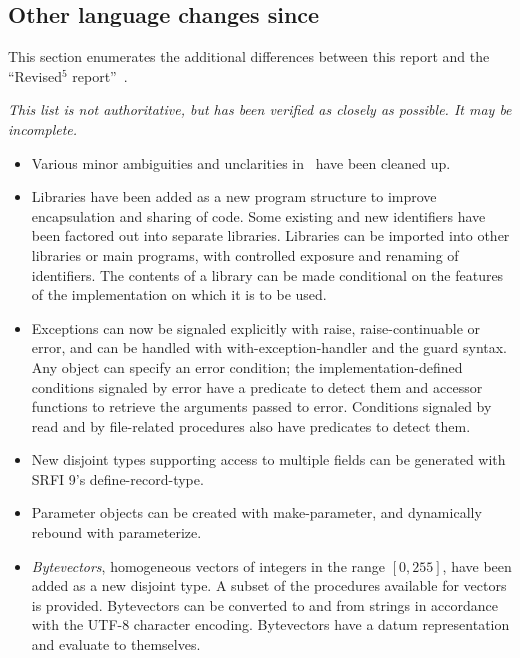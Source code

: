 \subsection*{Other language changes since \rfivers}
\label{differences}
This section enumerates the additional differences between this report and
the ``Revised$^5$ report''~\cite{R5RS}.

{\em This list is not authoritative, but has been verified as closely
as possible.  It may be incomplete.}


\begin{itemize}

\item Various minor ambiguities and unclarities in \rfivers\ have been cleaned up.

\item Libraries have been added as a new program structure to improve
encapsulation and sharing of code.  Some existing and new identifiers
have been factored out into separate libraries.
Libraries can be imported into other libraries or main programs, with
controlled exposure and renaming of identifiers.
The contents of a library can be made conditional on the features of
the implementation on which it is to be used.

\item Exceptions can now be signaled explicitly with {\cf raise},
{\cf raise-continuable} or {\cf error}, and can be handled with {\cf
with-exception-handler} and the {\cf guard} syntax.
Any object can specify an error condition; the implementation-defined
conditions signaled by {\cf error} have a predicate to detect them and accessor functions to
retrieve the arguments passed to {\cf error}.
Conditions signaled by {\cf read} and by file-related procedures
also have predicates to detect them.

\item New disjoint types supporting access to multiple fields can be
generated with SRFI 9's {\cf define-record-type}.

\item Parameter objects can be created with {\cf make-parameter}, and
dynamically rebound with {\cf parameterize}.

\item {\em Bytevectors}, homogeneous vectors of integers in the range
$[0, 255]$, have been added as a new disjoint type.
A subset of the procedures available for vectors is provided.  Bytevectors
can be converted to and from strings in accordance with the UTF-8 character encoding.
Bytevectors have a datum representation and evaluate to themselves.


\end{itemize}
